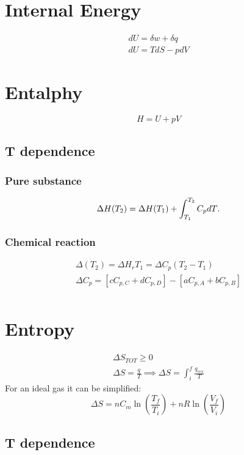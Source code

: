 \documentclass[a4paper]{report}
\begin{document}
\begin{multicols}{2}
    \section{Internal Energy}
    \begin{gather*}
    dU = \delta w + \delta q \\
    dU = TdS - pdV 
    \end{gather*}
    
    \section{Entalphy}
             $$ H = U + pV $$

      \subsection{T dependence}
      \subsubsection{Pure substance}
      \[
        \Delta H(T_2) = \Delta H(T_1) + \int _{T_1} ^{T_2} C_{p}dT\\
      .\] 
    \subsubsection{Chemical reaction}
    \begin{gather*}
        \Delta (T_2) = \Delta H_{r}T_1 = \Delta C_{p}(T_2 - T_1)\\
        \Delta C_{p} = [c C_{p,C} + d C_{p,D}] - [a C_{p,A} + b C_{p,B}] \\
    \end{gather*}

    \section{Entropy} 

    \begin{gather*}
       \Delta S_{TOT} \geq 0 \\  
       \Delta S  = \frac{q}{T} \implies \Delta S = \int _{i} ^{f} \frac{q_{rev}}{T}
     \end{gather*} 
    For an ideal gas it can be simplified:
    \[
      \Delta S = nC_{m}\ln \left( \frac{T_{f}}{T_{i} }  \right) + nR\ln \left( \frac{V_{f}}{V_{i} }  \right)  
    \]

    \subsection{T dependence}

\end{multicols}
\end{document}
